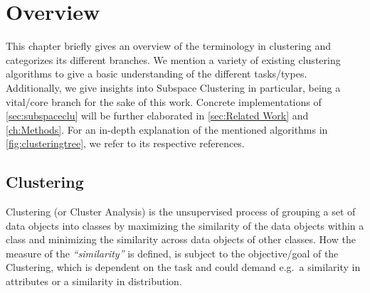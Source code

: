 \chapter{Overview}\label{ch:overview}

This chapter briefly gives an overview of the terminology in clustering and categorizes its different branches. We mention a variety of existing clustering algorithms to give a basic understanding of the different tasks/types. Additionally, we give insights into Subspace Clustering in particular, being a vital/core branch for the sake of this work. Concrete implementations of \autoref{sec:subspaceclu} will be further elaborated in \autoref{sec:Related Work} and \autoref{ch:Methods}. For an in-depth explanation of the mentioned algorithms in \autoref{fig:clusteringtree}, we refer to its respective references.

\section{Clustering}\label{sec:clu}
Clustering (or Cluster Analysis) is the unsupervised process of grouping a set of data objects into classes by maximizing the similarity of the data objects within a class and minimizing the similarity across data objects of other classes. How the measure of the \textit{``similarity''} is defined, is subject to the objective/goal of the Clustering, which is dependent on the task and could demand e.g.\ a similarity in attributes or a similarity in distribution. 

